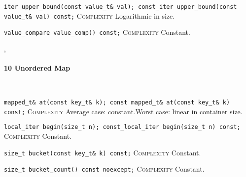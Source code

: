 \noindent{}\hspace*{0.25em}\lstinline[basicstyle=\ttfamily\color{clime}]{iter upper_bound(const value_t& val); const_iter upper_bound(const value_t& val) const;} \textsc{Complexity} Logarithmic in size.\\\vspace{-0.6em}

\noindent{}\hspace*{0.25em}\lstinline[basicstyle=\ttfamily\color{cgreen}]{value_compare value_comp() const;} \textsc{Complexity} Constant.\\\vspace{-0.6em}


\sep
{}
\paragraph{10 Unordered Map}\mbox{}\vspace{0.5em}\\
\noindent{}\hspace*{0.25em}\lstinline[basicstyle=\ttfamily\color{corange}]{mapped_t& at(const key_t& k); const mapped_t& at(const key_t& k) const;} \textsc{Complexity} Average case: constant.Worst case: linear in container size.\\\vspace{-0.6em}

\noindent{}\hspace*{0.25em}\lstinline[basicstyle=\ttfamily\color{cgreen}]{local_iter begin(size_t n); const_local_iter begin(size_t n) const;} \textsc{Complexity} Constant.\\\vspace{-0.6em}

\noindent{}\hspace*{0.25em}\lstinline[basicstyle=\ttfamily\color{cgreen}]{size_t bucket(const key_t& k) const;} \textsc{Complexity} Constant.\\\vspace{-0.6em}

\noindent{}\hspace*{0.25em}\lstinline[basicstyle=\ttfamily\color{cgreen}]{size_t bucket_count() const noexcept;} \textsc{Complexity} Constant.\\\vspace{-0.6em}

